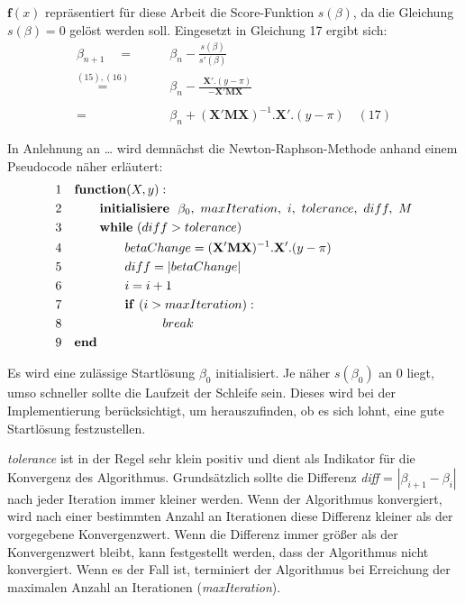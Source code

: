 \documentclass[12pt,]{article}
\begin{document}
\(\mathbf{f}(x)\) repräsentiert für diese Arbeit die Score-Funktion
\(s(\beta)\), da die Gleichung \(s(\beta) = 0\) gelöst werden soll.
Eingesetzt in Gleichung 17 ergibt sich: \[
\begin{aligned}
\beta_{n+1}\quad  = \qquad &\beta_n - \frac{s(\beta)}{s'(\beta)} \\
\mathrel{\overset{(15),(16)}{=}} \quad &\beta_n - \frac{\ \  \mathbf{X}'.(y-\pi)}{- \mathbf{X}'\mathbf{M}\mathbf{X}} \\ \\
= \qquad &\beta_n + (\mathbf{X}'\mathbf{M}\mathbf{X})^{-1}.\mathbf{X}'.(y-\pi) \quad (17)
\end{aligned} 
\]

In Anlehnung an \ldots{} wird demnächst die Newton-Raphson-Methode
anhand einem Pseudocode näher erläutert: \[
\begin{aligned}
&1 \quad \mathbf{function}(X, y): \\
&2 \qquad \quad   \mathbf{initialisiere} \ \ \beta_0,\ maxIteration,\ i,\ tolerance,\ diff,\ M \\
&3 \qquad \quad  \mathbf{while} \ (diff > tolerance) \\
&4 \qquad \qquad \quad betaChange = (\mathbf{X}'\mathbf{M}\mathbf{X})^{-1}.\mathbf{X}'.(y-\pi) \\
&5 \qquad \qquad \quad diff = | betaChange| \\
&6 \qquad \qquad \quad      i = i + 1 \\
&7 \qquad \qquad \quad      \mathbf{if} \ (i > maxIteration): \\
&8  \qquad \qquad \qquad \qquad          break \\ 
&9 \quad \bf{end} 
\end{aligned}
\]

Es wird eine zulässige Startlösung \(\beta_0\) initialisiert. Je näher
\(s(\beta_0)\) an 0 liegt, umso schneller sollte die Laufzeit der
Schleife sein. Dieses wird bei der Implementierung berücksichtigt, um
herauszufinden, ob es sich lohnt, eine gute Startlösung festzustellen.

\emph{tolerance} ist in der Regel sehr klein positiv und dient als
Indikator für die Konvergenz des Algorithmus. Grundsätzlich sollte die
Differenz \emph{diff} = \(|\beta_{i+1} - \beta_i|\) nach jeder Iteration
immer kleiner werden. Wenn der Algorithmus konvergiert, wird nach einer
bestimmten Anzahl an Iterationen diese Differenz kleiner als der
vorgegebene Konvergenzwert. Wenn die Differenz immer größer als der
Konvergenzwert bleibt, kann festgestellt werden, dass der Algorithmus
nicht konvergiert. Wenn es der Fall ist, terminiert der Algorithmus bei
Erreichung der maximalen Anzahl an Iterationen (\emph{maxIteration}).
\end{document}

